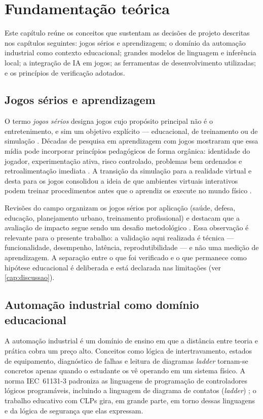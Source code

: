 \chapter{Fundamentação teórica}
\label{cap:fundamentacao}

Este capítulo reúne os conceitos que sustentam as decisões de projeto
descritas nos capítulos seguintes: jogos sérios e aprendizagem; o domínio da
automação industrial como contexto educacional; grandes modelos de linguagem e
inferência local; a integração de IA em jogos; as ferramentas de
desenvolvimento utilizadas; e os princípios de verificação adotados.

\section{Jogos sérios e aprendizagem}
\label{sec:jogos_serios}

O termo \emph{jogos sérios} designa jogos cujo propósito principal não é o
entretenimento, e sim um objetivo explícito --- educacional, de treinamento ou
de simulação \cite{abt1970serious}. Décadas de pesquisa em aprendizagem com
jogos mostraram que essa mídia pode incorporar princípios pedagógicos de forma
orgânica: identidade do jogador, experimentação ativa, risco controlado,
problemas bem ordenados e retroalimentação imediata \cite{gee2003what}. A
transição da simulação para a realidade virtual e desta para os jogos
consolidou a ideia de que ambientes virtuais interativos podem treinar
procedimentos antes que o aprendiz os execute no mundo físico
\cite{zyda2005from}.

Revisões do campo organizam os jogos sérios por aplicação (saúde, defesa,
educação, planejamento urbano, treinamento profissional) e destacam que a
avaliação de impacto segue sendo um desafio metodológico
\cite{laamarti2014overview}. Essa observação é relevante para o presente
trabalho: a validação aqui realizada é técnica --- funcionalidade, desempenho,
latência, reprodutibilidade --- e não uma medição de aprendizagem. A separação
entre o que foi verificado e o que permanece como hipótese educacional é
deliberada e está declarada nas limitações (ver \autoref{cap:discussao}).

\section{Automação industrial como domínio educacional}
\label{sec:automacao}

A automação industrial é um domínio de ensino em que a distância entre teoria
e prática cobra um preço alto. Conceitos como lógica de intertravamento,
estados de equipamento, diagnóstico de falhas e leitura de diagramas
\emph{ladder} tornam-se concretos apenas quando o estudante os vê operando em
um sistema físico. A norma IEC~61131-3 padroniza as linguagens de programação
de controladores lógicos programáveis, incluindo a linguagem de diagrama de
contatos (\emph{ladder}) \cite{iec61131}; o trabalho educativo com CLPs gira,
em grande parte, em torno dessas linguagens e da lógica de segurança que elas
expressam.

